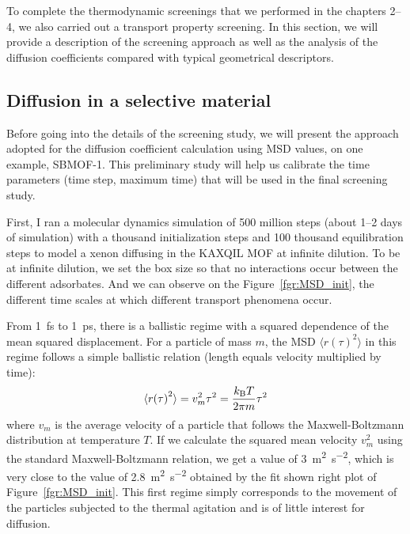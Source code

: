 \documentclass[main]{subfiles}
\begin{document}
To complete the thermodynamic screenings that we performed in the chapters 2--4, we also carried out a transport property screening. In this section, we will provide a description of the screening approach as well as the analysis of the diffusion coefficients compared with typical geometrical descriptors.

\subsection{Diffusion in a selective material}

Before going into the details of the screening study, we will present the approach adopted for the diffusion coefficient calculation using MSD values, on one example, SBMOF-1\autocite{Banerjee_2016}. This preliminary study will help us calibrate the time parameters (time step, maximum time) that will be used in the final screening study.

First, I ran a molecular dynamics simulation of 500 million steps (about 1--2 days of simulation) with a thousand initialization steps and 100 thousand equilibration steps to model a xenon diffusing in the KAXQIL\autocite{Banerjee2012} MOF at infinite dilution. To be at infinite dilution, we set the box size so that no interactions occur between the different adsorbates. And we can observe on the Figure~\ref{fgr:MSD_init}, the different time scales at which different transport phenomena occur. 

From \SI{1}{\fs} to \SI{1}{\ps}, there is a ballistic regime with a squared dependence of the mean squared displacement. For a particle of mass $m$, the MSD $\langle {r(\tau)}^2 \rangle$ in this regime follows a simple ballistic relation (length equals velocity multiplied by time):
\begin{equation}
  \langle {r(\tau)}^2 \rangle = v_m^2 \tau^2 = \frac{k_{\text{B}}T}{2\pi m}\tau^2
\end{equation}
where $v_m$ is the average velocity of a particle that follows the Maxwell-Boltzmann distribution at temperature $T$. If we calculate the squared mean velocity $v_m^2$ using the standard Maxwell-Boltzmann relation, we get a value of \SI{3}{\square\m\per\square\second}, which is very close to the value of \SI{2.8}{\square\m\per\square\second} obtained by the fit shown right plot of Figure~\ref{fgr:MSD_init}. This first regime simply corresponds to the movement of the particles subjected to the thermal agitation and is of little interest for diffusion. 
\end{document}
